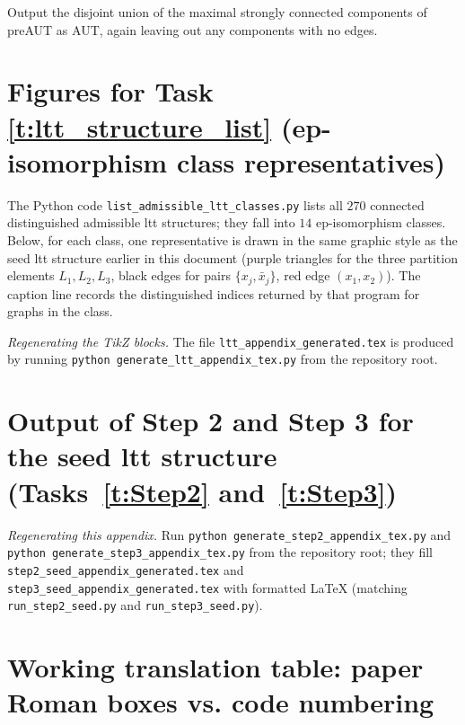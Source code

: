 \documentclass[11pt]{article}
\theoremstyle{definition}
\begin{document}
Output the disjoint union of the maximal strongly connected components of preAUT as AUT, again leaving out any components with no edges.

\appendix

\section{Figures for Task \ref{t:ltt_structure_list} (ep-isomorphism class representatives)}

The Python code \texttt{list\_admissible\_ltt\_classes.py} lists all $270$ connected distinguished admissible ltt structures; they fall into $14$ ep-isomorphism classes. Below, for each class, one representative is drawn in the same graphic style as the seed ltt structure earlier in this document (purple triangles for the three partition elements $L_1,L_2,L_3$, black edges for pairs $\{x_j,\bar{x}_j\}$, red edge $(x_1,x_2)$). The caption line records the distinguished indices returned by that program for graphs in the class.

\smallskip
\noindent\textit{Regenerating the TikZ blocks.} The file \texttt{ltt\_appendix\_generated.tex} is produced by running \texttt{python generate\_ltt\_appendix\_tex.py} from the repository root.



\section[Output of Step 2 and Step 3 for the seed ltt structure]{Output of Step 2 and Step 3 for the seed ltt structure (Tasks~\ref{t:Step2} and~\ref{t:Step3})}

\noindent\textit{Regenerating this appendix.} Run \texttt{python generate\_step2\_appendix\_tex.py} and \texttt{python generate\_step3\_appendix\_tex.py} from the repository root; they fill \texttt{step2\_seed\_appendix\_generated.tex} and \texttt{step3\_seed\_appendix\_generated.tex} with formatted \LaTeX{} (matching \texttt{run\_step2\_seed.py} and \texttt{run\_step3\_seed.py}).








\section{Working translation table: paper Roman boxes vs. code numbering}
\end{document}
